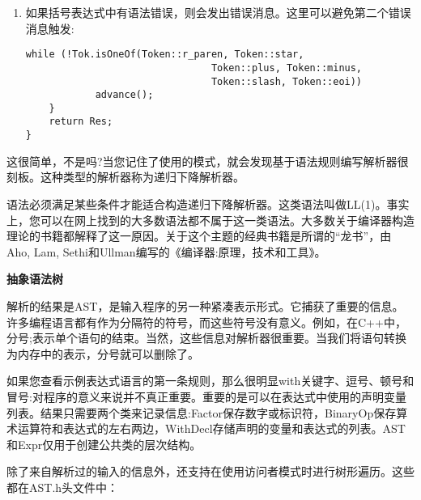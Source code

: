 \begin{enumerate}
\item 如果括号表达式中有语法错误，则会发出错误消息。这里可以避免第二个错误消息触发:
\begin{lstlisting}[caption={}]
			while (!Tok.isOneOf(Token::r_paren, Token::star,
								Token::plus, Token::minus,
								Token::slash, Token::eoi))
			advance();
	}
	return Res;
}
\end{lstlisting}

\end{enumerate}

这很简单，不是吗?当您记住了使用的模式，就会发现基于语法规则编写解析器很刻板。这种类型的解析器称为递归下降解析器。

\begin{tcolorbox}[colback=blue!5!white,colframe=blue!75!black, title=递归下降解析器不能适配所有语法]
语法必须满足某些条件才能适合构造递归下降解析器。这类语法叫做LL(1)。事实上，您可以在网上找到的大多数语法都不属于这一类语法。大多数关于编译器构造理论的书籍都解释了这一原因。关于这个主题的经典书籍是所谓的“龙书”，由Aho, Lam, Sethi和Ullman编写的《编译器:原理，技术和工具》。
\end{tcolorbox}


\hspace*{\fill} \par %
\textbf{抽象语法树}

解析的结果是AST，是输入程序的另一种紧凑表示形式。它捕获了重要的信息。许多编程语言都有作为分隔符的符号，而这些符号没有意义。例如，在C++中，分号;表示单个语句的结束。当然，这些信息对解析器很重要。当我们将语句转换为内存中的表示，分号就可以删除了。\par

如果您查看示例表达式语言的第一条规则，那么很明显with关键字、逗号、顿号和冒号:对程序的意义来说并不真正重要。重要的是可以在表达式中使用的声明变量列表。结果只需要两个类来记录信息:Factor保存数字或标识符，BinaryOp保存算术运算符和表达式的左右两边，WithDecl存储声明的变量和表达式的列表。AST和Expr仅用于创建公共类的层次结构。\par

除了来自解析过的输入的信息外，还支持在使用访问者模式时进行树形遍历。这些都在AST.h头文件中：\par


